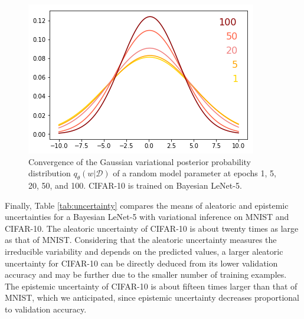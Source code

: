 \begin{figure}[t!] 
\begin{center}
\includegraphics[width=\linewidth]{Chapter5/Figs/distribution.png}
\caption{Convergence of the Gaussian variational posterior probability distribution $q_{\theta}(w|\mathcal{D})$ of a random model parameter at epochs 1, 5, 20, 50, and 100. CIFAR-10 is trained on Bayesian LeNet-5.}
\label{fig:distribution}
\end{center}
\end{figure} 
%
\newline Finally, Table \ref{tab:uncertainty} compares the means of aleatoric and epistemic uncertainties for a Bayesian LeNet-5 with variational inference on MNIST and CIFAR-10. The aleatoric uncertainty of CIFAR-10 is about twenty times as large as that of MNIST. Considering that the aleatoric uncertainty measures the irreducible variability and depends on the predicted values, a larger aleatoric uncertainty for CIFAR-10 can be directly deduced from its lower validation accuracy and may be further due to the smaller number of training examples. The epistemic uncertainty of CIFAR-10 is about fifteen times larger than that of MNIST, which we anticipated, since epistemic uncertainty decreases proportional to validation accuracy. 
\begin{table}[t!]
\tiny
    \centering
    \renewcommand{\arraystretch}{1.5}
    \renewcommand{\arraystretch}{1.5}
    \caption{Aleatoric and epistemic uncertainty for Bayesian LeNet-5 calculated for MNIST and CIFAR-10, computed as proposed by Kwon et al. \cite{kwon2018uncertainty}.}
    \label{tab:uncertainty}
\end{table}
%
